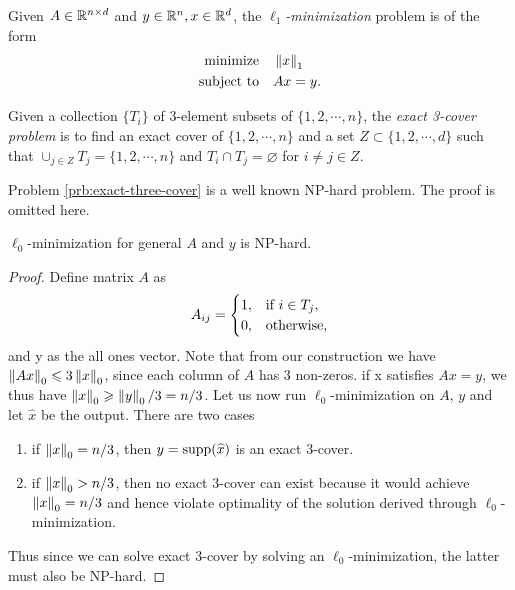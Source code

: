 \documentclass[11pt]{article}
\begin{document}
\begin{definition}
    Given \(A\in\mathbb R^{n\times d}\) and \(y\in\mathbb R^n,x\in\mathbb R^d\), the \emph{\(\ell_1\)-minimization} problem is of the form
    \[\begin{aligned}
        \textnormal{minimize}\quad & \left\|x\right\|_1\\
        \textnormal{subject to}\quad & Ax=y.
    \end{aligned}\]
\end{definition}

\begin{problem}\label{prb:exact-three-cover}
    Given a collection \(\{T_i\}\) of 3-element subsets of \(\{1,2,\cdots,n\}\), the \emph{exact 3-cover problem} is to find an exact cover of \(\{1,2,\cdots,n\}\) and a set \(Z \subset \{1,2,\cdots,d\}\) such that \(\cup_{j \in Z}T_j = \{1,2,\cdots,n\}\) and \(T_i \cap T_j = \varnothing\) for \(i\neq j\in Z\).
\end{problem}

\begin{remark}
    Problem \ref{prb:exact-three-cover} is a well known NP-hard problem. The proof is omitted here.
\end{remark}

\begin{theorem}
    \(\ell_0\)-minimization for general \(A\) and \(y\) is NP-hard.
\end{theorem}
\begin{proof}
    Define matrix \(A\) as
    \[A_{ij}=\begin{cases}
        1, & \text{if } i \in T_j,\\
        0, & \textnormal{otherwise},
    \end{cases}\]
    and y as the all ones vector. Note that from our construction we have \(\left\|Ax\right\|_0 \leqslant 3\left\|x\right\|_0\), since each column of \(A\) has 3 non-zeros. if x satisfies \(Ax=y\), we thus have \(\left\|x\right\|_0 \geqslant \left\|y\right\|_0/3 = n/3\). Let us now run \(\ell_0\)-minimization on \(A\), \(y\) and let \(\widehat{x}\) be the output. There are two cases
    \begin{enumerate}
        \item if \(\left\|x\right\|_0 = n/3\), then \(y = \operatorname{supp}(\widehat{x})\) is an exact 3-cover.
        \item if \(\left\|x\right\|_0 > n/3\), then no exact 3-cover can exist because it would achieve \(\left\|x\right\|_0 = n/3\) and hence violate optimality of the solution derived through \(\ell_0\)-minimization.
    \end{enumerate}
    Thus since we can solve exact 3-cover by solving an \(\ell_0\)-minimization, the latter must also be NP-hard.
\end{proof}
\end{document}
